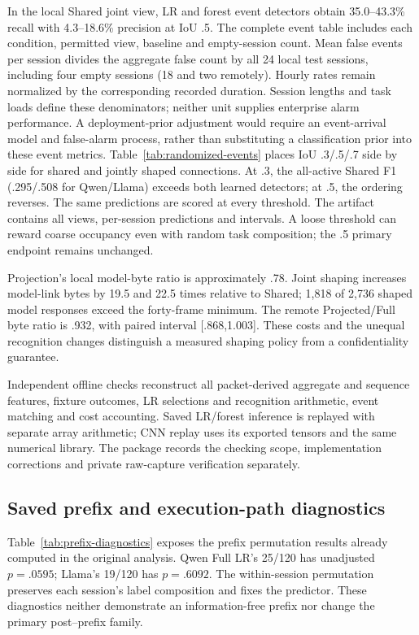 In the local Shared joint view, LR and forest event detectors obtain 35.0--43.3\% recall with 4.3--18.6\% precision at IoU .5. The complete event table includes each condition, permitted view, baseline and empty-session count. Mean false events per session divides the aggregate false count by all 24 local test sessions, including four empty sessions (18 and two remotely). Hourly rates remain normalized by the corresponding recorded duration. Session lengths and task loads define these denominators; neither unit supplies enterprise alarm performance. A deployment-prior adjustment would require an event-arrival model and false-alarm process, rather than substituting a classification prior into these event metrics. Table~\ref{tab:randomized-events} places IoU .3/.5/.7 side by side for shared and jointly shaped connections. At .3, the all-active Shared F1 (.295/.508 for Qwen/Llama) exceeds both learned detectors; at .5, the ordering reverses. The same predictions are scored at every threshold. The artifact contains all views, per-session predictions and intervals. A loose threshold can reward coarse occupancy even with random task composition; the .5 primary endpoint remains unchanged.

Projection's local model-byte ratio is approximately .78. Joint shaping increases model-link bytes by 19.5 and 22.5 times relative to Shared; 1,818 of 2,736 shaped model responses exceed the forty-frame minimum. The remote Projected/Full byte ratio is .932, with paired interval [.868,1.003]. These costs and the unequal recognition changes distinguish a measured shaping policy from a confidentiality guarantee.

Independent offline checks reconstruct all packet-derived aggregate and sequence features, fixture outcomes, LR selections and recognition arithmetic, event matching and cost accounting. Saved LR/forest inference is replayed with separate array arithmetic; CNN replay uses its exported tensors and the same numerical library. The package records the checking scope, implementation corrections and private raw-capture verification separately.

\subsection{Saved prefix and execution-path diagnostics}
Table~\ref{tab:prefix-diagnostics} exposes the prefix permutation results already computed in the original analysis. Qwen Full LR's 25/120 has unadjusted $p=.0595$; Llama's 19/120 has $p=.6092$. The within-session permutation preserves each session's label composition and fixes the predictor. These diagnostics neither demonstrate an information-free prefix nor change the primary post--prefix family.

